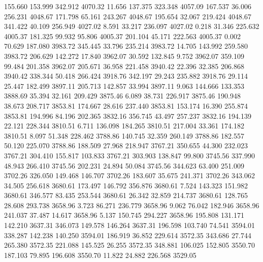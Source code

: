  155.660  153.999  342.912      4070.32
  11.656  137.375  323.348      4057.09
 167.537   36.006  256.231      4048.67
 171.798   65.161  243.267      4048.67
 195.654   32.067  219.424      4048.67
 341.422   40.109  256.949      4027.02
   8.591   33.217  236.097      4027.02
   0.218   31.346  225.632      4005.37
 181.325   99.932   95.806      4005.37
 201.104   45.171  222.563      4005.37
   0.002   70.629  187.080      3983.72
 345.445   33.796  235.214      3983.72
  14.705  143.992  259.580      3983.72
 206.629  142.272   17.840      3962.07
  30.592  132.845    9.752      3962.07
 359.109   99.484  201.358      3962.07
 205.671   36.958  221.458      3940.42
  22.396   32.385  206.868      3940.42
 338.344   50.418  266.424      3918.76
 342.197   29.243  235.882      3918.76
  29.114   25.447  182.499      3897.11
 205.713  142.857   33.994      3897.11
   9.063  144.666  133.353      3888.69
  35.394   32.161  209.429      3875.46
   6.089   38.731  226.917      3875.46
 190.948   38.673  208.717      3853.81
 174.667   28.616  237.440      3853.81
 153.174   16.390  255.874      3853.81
 194.996   84.196  202.365      3832.16
 356.745   43.497  257.237      3832.16
 194.139   22.121  228.344      3810.51
   6.711  136.098  184.265      3810.51
 217.004   33.361  174.182      3810.51
   8.097   51.348  228.462      3788.86
 140.745   32.359  260.149      3788.86
 182.557   50.120  225.070      3788.86
 188.509   27.968  218.947      3767.21
 350.655   44.300  232.023      3767.21
 304.410  155.817  103.833      3767.21
 303.903  138.847   99.800      3745.56
 337.990   48.943  266.410      3745.56
 202.231   24.894   50.084      3745.56
 344.623   63.400  251.009      3702.26
 326.050  149.468  146.707      3702.26
 183.607   35.675  241.371      3702.26
 343.062   34.505  256.618      3680.61
 173.497  146.792  356.876      3680.61
   7.524  143.323  151.982      3680.61
 346.577   83.435  253.544      3680.61
  26.342   32.859  214.737      3680.61
 128.765   28.608  293.738      3658.96
   3.723   86.271  236.779      3658.96
   9.062   76.042  182.946      3658.96
 241.037   37.487   14.617      3658.96
   5.137  150.745  294.227      3658.96
 195.808  131.171  142.210      3637.31
 346.073  149.578  146.264      3637.31
 196.598  103.740   74.541      3594.01
 338.287  142.238  140.250      3594.01
 186.919   36.852  229.614      3572.35
 343.686   27.744  265.380      3572.35
 221.088  145.525   26.255      3572.35
 348.881  106.025  152.805      3550.70
 187.103   79.895  196.608      3550.70
  11.822   24.882  226.568      3529.05
